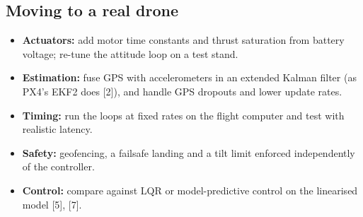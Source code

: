 \subsection{Moving to a real drone}
\begin{itemize}[itemsep=0pt,topsep=2pt]
\item \textbf{Actuators:} add motor time constants and thrust saturation from battery voltage; re-tune the attitude loop on a test stand.
\item \textbf{Estimation:} fuse GPS with accelerometers in an extended Kalman filter (as PX4's EKF2 does [2]), and handle GPS dropouts and lower update rates.
\item \textbf{Timing:} run the loops at fixed rates on the flight computer and test with realistic latency.
\item \textbf{Safety:} geofencing, a failsafe landing and a tilt limit enforced independently of the controller.
\item \textbf{Control:} compare against LQR or model-predictive control on the linearised model [5], [7].
\end{itemize}
